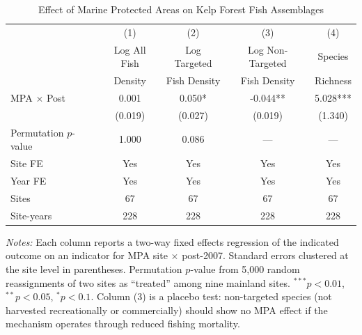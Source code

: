 \begin{table}[t]
\centering
\caption{Effect of Marine Protected Areas on Kelp Forest Fish Assemblages}
\label{tab:main}
\begin{threeparttable}
\begin{tabular}{lcccc}
\toprule
 & (1) & (2) & (3) & (4) \\
 & Log All Fish & Log Targeted & Log Non-Targeted & Species \\
 & Density & Fish Density & Fish Density & Richness \\
\midrule
MPA $\times$ Post & 0.001 & 0.050* & -0.044** & 5.028*** \\
 & (0.019) & (0.027) & (0.019) & (1.340) \\
\addlinespace
Permutation $p$-value & 1.000 & 0.086 & --- & --- \\
\addlinespace
Site FE & Yes & Yes & Yes & Yes \\
Year FE & Yes & Yes & Yes & Yes \\
Sites & 67 & 67 & 67 & 67 \\
Site-years & 228 & 228 & 228 & 228 \\
\bottomrule
\end{tabular}
\begin{tablenotes}[flushleft]
\footnotesize
\item \textit{Notes:} Each column reports a two-way fixed effects regression of the indicated outcome on an indicator for MPA site $\times$ post-2007. Standard errors clustered at the site level in parentheses. Permutation $p$-value from 5,000 random reassignments of two sites as ``treated'' among nine mainland sites. $^{***}p<0.01$, $^{**}p<0.05$, $^{*}p<0.1$. Column (3) is a placebo test: non-targeted species (not harvested recreationally or commercially) should show no MPA effect if the mechanism operates through reduced fishing mortality.
\end{tablenotes}
\end{threeparttable}
\end{table}
